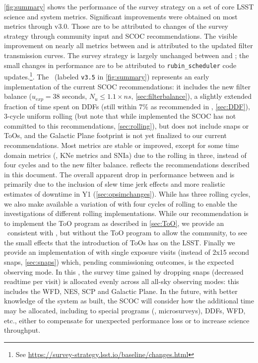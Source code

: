  \autoref{fig:summary} shows the performance of the survey strategy on a set of core LSST science and system metrics. Significant improvements were obtained on most metrics through v3.0. Those are to be attributed to changes of the survey strategy through community input and SCOC recommendations. The visible improvement on nearly all metrics between  and  is attributed to the updated filter transmission curves. The survey strategy is largely unchanged between  and ; the small changes in performance are to be attributed to  \texttt{rubin\_scheduler} code updates.\footnote{See \url{https://survey-strategy.lsst.io/baseline/changes.html}}. The  \opsim\ (labeled \texttt{v3.5} in \autoref{fig:summary}) represents an early implementation of the current SCOC recommendations: it includes the new filter balance ($u_{exp}=38$ seconds, $N_u \leq1.1\times ns$, \autoref{sec:filterbalance}), a slightly extended fraction of time spent on DDFs (still within 7\% as recommended in , \autoref{sec:DDF}), 3-cycle uniform rolling (but note that while implemented the SCOC has not committed to this recommendations, \autoref{sec:rolling}), but does not include snaps or ToOs, and the Galactic Plane footprint is not yet finalized to our current recommendations. Most metrics are stable or improved, except for some time domain metrics (\eg, KNe metrics and SNIa) due to the rolling in three, instead of four cycles and to the new filter balance.  reflects the recommendations described in this document. The overall apparent drop in performance between  and  is primarily due to the inclusion of slew time jerk effects and more realistic estimates of downtime in Y1 (\autoref{sec:opsimchanges}). While  has three rolling cycles, we also make available a variation of  with four cycles of rolling to enable the investigations of different rolling implementations. While our recommendation is to implement the ToO program as described in \autoref{sec:ToO}, we provide an \opsim\ consistent with , but without the ToO program to allow the community, to see the small effects that the introduction of ToOs has on the LSST. Finally we provide an implementation of  with single exposure visits (instead of 2x15 second snaps, \autoref{sec:snaps}) which, pending commissioning outcomes, is the expected observing mode. In this \opsim, the survey time gained by dropping snaps (decreased readtime per visit) is allocated evenly across all all-sky observing modes: this includes the WFD, NES, SCP and Galactic Plane. In the future, with better knowledge of the system as built, the SCOC will consider how the additional time may be allocated, including to special programs (\eg, microsurveys), DDFs, WFD, etc., either to compensate for unexpected performance loss or to increase science throughput.


